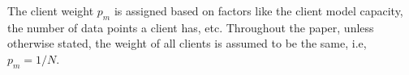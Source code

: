 \documentclass{article}
\newcommand{\Luyang}[1]{\textcolor{orange}{(Luyang: #1)}}
\begin{document}
The client weight $p_m$ is assigned based on factors like the client model capacity, the number of data points a client has, etc. 
Throughout the paper, unless otherwise stated, the weight of all clients is assumed to be the same, i.e, $p_m = 1/N$. %
\end{document}

